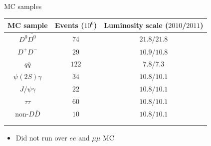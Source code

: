 \documentclass{beamer}
\begin{document}
\begin{frame}{MC samples}
  \centering
  \begin{tabular}{ccc}
    MC sample & Events ($10^6$) & Luminosity scale ($2010$/$2011$) \\
    \hline
    $D^0\bar{D^0}$     & $74$   & $21.8$/$21.8$ \\
    $D^+D^-$           & $29$   & $10.9$/$10.8$ \\
    $q\bar{q}$         & $122$  & $7.8$/$7.3$   \\
    $\psi(2S)\gamma$   & $34$   & $10.8$/$10.1$ \\
    $J/\psi\gamma$     & $22$   & $10.8$/$10.1$ \\
    $\tau\tau$         & $60$   & $10.8$/$10.1$ \\
    non-$D\bar{D}$     & $10$   & $10.8$/$10.1$ \\ \\ \\
  \end{tabular}
  \begin{itemize}
    \item{Did not run over $ee$ and $\mu\mu$ MC}
  \end{itemize}
\end{frame}
\end{document}
